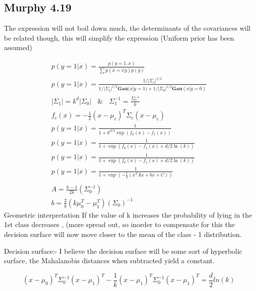 \subsection{Murphy 4.19}
The expression will not boil down much, the determinants of the covariances will be related though, this will simplify the expression (Uniform prior has been assumed)

\begin{gather*}
    p(y = 1| x)  = \frac{p(y = 1, x)}{\sum p(x = i | y)p(y)}
    \\
    p(y = 1| x)  = \frac{1/|\Sigma_1|^{1/2}}{1/|\Sigma_1|^{1/2}\textbf{Gau}(x|y=1) + 1/|\Sigma_0|^{1/2}\textbf{Gau}(x|y = 0) }
    \\
    |\Sigma_1| = k^d |\Sigma_0 | \ \ \ \ \& \ \ \ \  \Sigma_1^{-1} = \frac{\Sigma_0^{-1} }{k}
    \\
     f_c(x) = -\frac{1}{2}(x - \mu_c)^T\Sigma_c(x - \mu_c)
     \\
    p(y = 1 | x) = \frac{1}{1 + k^{d/2}\exp(f_0(x) - f_1(x))}
    \\
    p(y = 1 | x) = \frac{1}{1 + \exp(f_0(x) - f_1(x) + d/2 \ln(k))}
    \\
     p(y = 1 | x) = \frac{1}{1 + \exp(f_0(x) - f_1(x) + d/2 \ln(k))}
     \\
     p(y = 1 | x) = \frac{1}{1 + \exp(-\frac{1}{2}( x^TAx + bx + C))} \\
     \\
     A = \frac{k - 1}{2k} (\Sigma_0^{-1})
     \\
     b = \frac{2}{k}(k\mu_0^T  - \mu_1^T)(\Sigma_0)^{-1}
\end{gather*}
Geometric interpretation
If the value of k increases the probability of lying in the 1st class decreases , (more spread out, so inorder to  compensate for this the decision surface will now move closer to the mean of the class - 1 distribution.

Decision surface:- I believe the decision surface will be some sort of hyperbolic surface, the Mahalanobis distances when subtracted yield a  constant.

\begin{equation}
    (x - \mu_0)^T\Sigma_0^{-1}(x - \mu_1)^T - \frac{1}{k}(x - \mu_1)^T\Sigma_0^{-1}(x - \mu_1)^T =\frac{d}{2}ln(k)
\end{equation}

